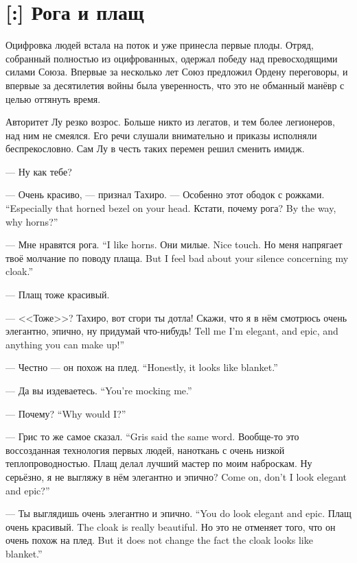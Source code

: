 \section{[:] Рога и плащ}

Оцифровка людей встала на поток и уже принесла первые плоды.
Отряд, собранный полностью из оцифрованных, одержал победу над превосходящими силами Союза.
Впервые за несколько лет Союз предложил Ордену переговоры, и впервые за десятилетия войны была уверенность, что это не обманный манёвр с целью оттянуть время.

Авторитет Лу резко возрос.
Больше никто из легатов, и тем более легионеров, над ним не смеялся.
Его речи слушали внимательно и приказы исполняли беспрекословно.
Сам Лу в честь таких перемен решил сменить имидж.

--- Ну как тебе?

--- Очень красиво, --- признал Тахиро.
{--- Особенно этот ободок с рожками.}
{``Especially that horned bezel on your head.}
{Кстати, почему рога?}
{By the way, why horns?''}

{--- Мне нравятся рога.}
{``I like horns.}
{Они милые.}
{Nice touch.}
{Но меня напрягает твоё молчание по поводу плаща.}
{But I feel bad about your silence concerning my cloak.''}

--- Плащ тоже красивый.

--- <<Тоже>>?
Тахиро, вот сгори ты дотла!
{Скажи, что я в нём смотрюсь очень элегантно, эпично, ну придумай что-нибудь!}
{Tell me I'm elegant, and epic, and anything you can make up!''}

{--- Честно --- он похож на плед.}
{``Honestly, it looks like blanket.''}

{--- Да вы издеваетесь.}
{``You're mocking me.''}

{--- Почему?}
{``Why would I?''}

{--- Грис то же самое сказал.}
{``Gris said the same word.}
Вообще-то это воссозданная технология первых людей, наноткань с очень низкой теплопроводностью.
Плащ делал лучший мастер по моим наброскам.
{Ну серьёзно, я не выгляжу в нём элегантно и эпично?}
{Come on, don't I look elegant and epic?''}

{--- Ты выглядишь очень элегантно и эпично.}
{``You do look elegant and epic.}
{Плащ очень красивый.}
{The cloak is really beautiful.}
{Но это не отменяет того, что он очень похож на плед.}
{But it does not change the fact the cloak looks like blanket.''}

